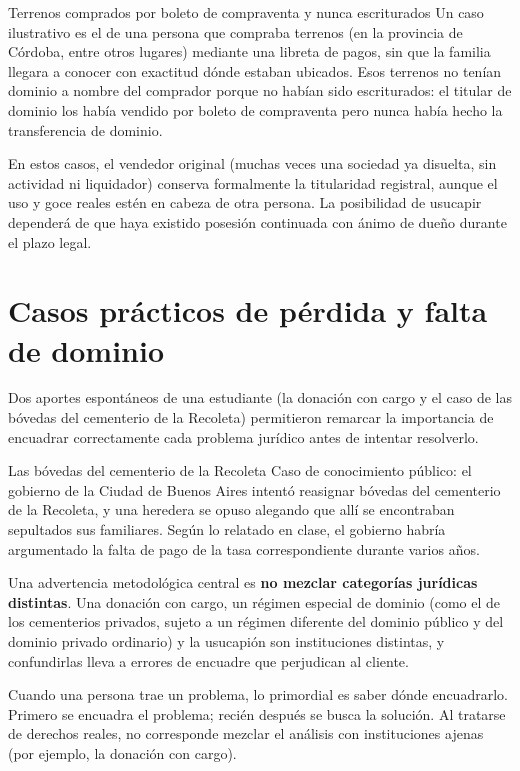 \documentclass[12pt,oneside]{book}
\begin{document}
\begin{example}{Terrenos comprados por boleto de compraventa y nunca escriturados}
Un caso ilustrativo es el de una persona que compraba terrenos (en la provincia de Córdoba, entre otros lugares) mediante una libreta de pagos, sin que la familia llegara a conocer con exactitud dónde estaban ubicados. Esos terrenos no tenían dominio a nombre del comprador porque no habían sido escriturados: el titular de dominio los había vendido por boleto de compraventa pero nunca había hecho la transferencia de dominio.

En estos casos, el vendedor original (muchas veces una sociedad ya disuelta, sin actividad ni liquidador) conserva formalmente la titularidad registral, aunque el uso y goce reales estén en cabeza de otra persona. La posibilidad de usucapir dependerá de que haya existido posesión continuada con ánimo de dueño durante el plazo legal.
\end{example}

\section{Casos prácticos de pérdida y falta de dominio}
\label{sec:casos-practicos}

Dos aportes espontáneos de una estudiante (la donación con cargo y el caso de las bóvedas del cementerio de la Recoleta) permitieron remarcar la importancia de encuadrar correctamente cada problema jurídico antes de intentar resolverlo.

\begin{example}{Las bóvedas del cementerio de la Recoleta}
Caso de conocimiento público: el gobierno de la Ciudad de Buenos Aires intentó reasignar bóvedas del cementerio de la Recoleta, y una heredera se opuso alegando que allí se encontraban sepultados sus familiares. Según lo relatado en clase, el gobierno habría argumentado la falta de pago de la tasa correspondiente durante varios años.
\end{example}

Una advertencia metodológica central es \textbf{no mezclar categorías jurídicas distintas}. Una donación con cargo, un régimen especial de dominio (como el de los cementerios privados, sujeto a un régimen diferente del dominio público y del dominio privado ordinario) y la usucapión son instituciones distintas, y confundirlas lleva a errores de encuadre que perjudican al cliente.

\begin{important}
Cuando una persona trae un problema, lo primordial es saber dónde encuadrarlo. Primero se encuadra el problema; recién después se busca la solución. Al tratarse de derechos reales, no corresponde mezclar el análisis con instituciones ajenas (por ejemplo, la donación con cargo).
\end{important}
\end{document}
